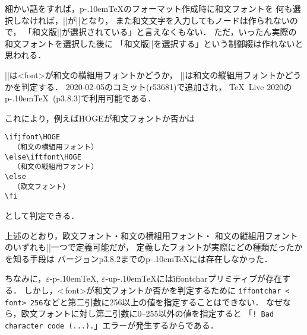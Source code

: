 \documentclass[a4paper,11pt,nomag]{jsarticle}
\def\epTeX{$\varepsilon$-\pTeX}\def\eTeX{$\varepsilon$-\TeX}
\def\eupTeX{$\varepsilon$-\upTeX}\def\upTeX{u\pTeX}
\def\pTeX{p\kern-.10em\TeX}
\begin{document}
\begin{dangerous}
  細かい話をすれば，\pTeX のフォーマット作成時に和文フォントを
  何も選択しなければ，|\fontname\jfont|が|\nullfont|となり，
  また和文文字を入力してもノードは作られないので，
  「和文版|\nullfont|が選択されている」と言えなくもない．
  ただ，いったん実際の和文フォントを選択した後に
  「和文版|\nullfont|を選択する」という制御綴は作れないと思われる．
\end{dangerous}

\begin{cslist}
  |\ifjfont|は<font>が和文の横組用フォントかどうか，
  |\iftfont|は和文の縦組用フォントかどうかを判定する．
  2020-02-05のコミット(r53681)で追加され，
  \TeX~Live 2020の\pTeX~(p3.8.3)で利用可能である．

  これにより，例えば\.{HOGE}が和文フォントか否かは
\begin{verbatim}
\ifjfont\HOGE
  （和文の横組用フォント）
\else\iftfont\HOGE
  （和文の縦組用フォント）
\else
  （欧文フォント）
\fi
\end{verbatim}
  として判定できる．
\end{cslist}

\begin{dangerous}
  上述のとおり，欧文フォント・和文の横組用フォント・
  和文の縦組用フォントのいずれも|\font|一つで定義可能だが，
  定義したフォントが実際にどの種類だったかを知る手段は
  バージョンp3.8.2までの\pTeX には存在しなかった．
\end{dangerous}

\begin{dangerous}
  ちなみに，\epTeX, \eupTeX には\.{iffontchar}プリミティブが存在する．
  しかし，<\,font>が和文フォントか否かを判定するために
  \texttt{\.{iffontchar}~<\,font>~256}などと第二引数に256以上の値を指定することはできない．
  なぜなら，欧文フォントに対し第二引数に0--255以外の値を指定すると
  「\verb+! Bad character code (...).+」エラーが発生するからである．
\end{dangerous}
\end{document}
